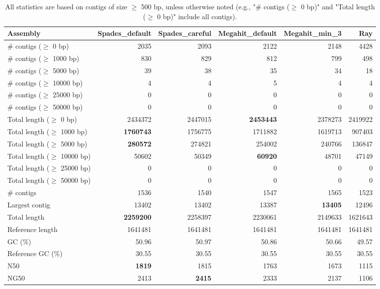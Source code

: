 \documentclass[12pt,a4paper]{article}
\begin{document}
\begin{table}[ht]
\begin{center}
\caption{All statistics are based on contigs of size $\geq$ 500 bp, unless otherwise noted (e.g., "\# contigs ($\geq$ 0 bp)" and "Total length ($\geq$ 0 bp)" include all contigs).}
\begin{tabular}{|l*{5}{|r}|}
\hline
Assembly & Spades\_default & Spades\_careful & Megahit\_default & Megahit\_min\_3 & Ray \\ \hline
\# contigs ($\geq$ 0 bp) & 2035 & 2093 & 2122 & 2148 & 4428 \\ \hline
\# contigs ($\geq$ 1000 bp) & 830 & 829 & 812 & 799 & 498 \\ \hline
\# contigs ($\geq$ 5000 bp) & 39 & 38 & 35 & 34 & 18 \\ \hline
\# contigs ($\geq$ 10000 bp) & 4 & 4 & 5 & 4 & 4 \\ \hline
\# contigs ($\geq$ 25000 bp) & 0 & 0 & 0 & 0 & 0 \\ \hline
\# contigs ($\geq$ 50000 bp) & 0 & 0 & 0 & 0 & 0 \\ \hline
Total length ($\geq$ 0 bp) & 2434372 & 2447015 & {\bf 2453443} & 2378273 & 2419922 \\ \hline
Total length ($\geq$ 1000 bp) & {\bf 1760743} & 1756775 & 1711882 & 1619713 & 907403 \\ \hline
Total length ($\geq$ 5000 bp) & {\bf 280572} & 274821 & 254002 & 240766 & 136847 \\ \hline
Total length ($\geq$ 10000 bp) & 50602 & 50349 & {\bf 60920} & 48701 & 47149 \\ \hline
Total length ($\geq$ 25000 bp) & 0 & 0 & 0 & 0 & 0 \\ \hline
Total length ($\geq$ 50000 bp) & 0 & 0 & 0 & 0 & 0 \\ \hline
\# contigs & 1536 & 1540 & 1547 & 1565 & 1523 \\ \hline
Largest contig & 13402 & 13402 & 13387 & {\bf 13405} & 12496 \\ \hline
Total length & {\bf 2259200} & 2258397 & 2230061 & 2149633 & 1621643 \\ \hline
Reference length & 1641481 & 1641481 & 1641481 & 1641481 & 1641481 \\ \hline
GC (\%) & 50.96 & 50.97 & 50.86 & 50.66 & 49.57 \\ \hline
Reference GC (\%) & 30.55 & 30.55 & 30.55 & 30.55 & 30.55 \\ \hline
N50 & {\bf 1819} & 1815 & 1763 & 1673 & 1115 \\ \hline
NG50 & 2413 & {\bf 2415} & 2333 & 2137 & 1106 \\ \hline

\end{tabular}
\end{center}
\end{table}
\end{document}
